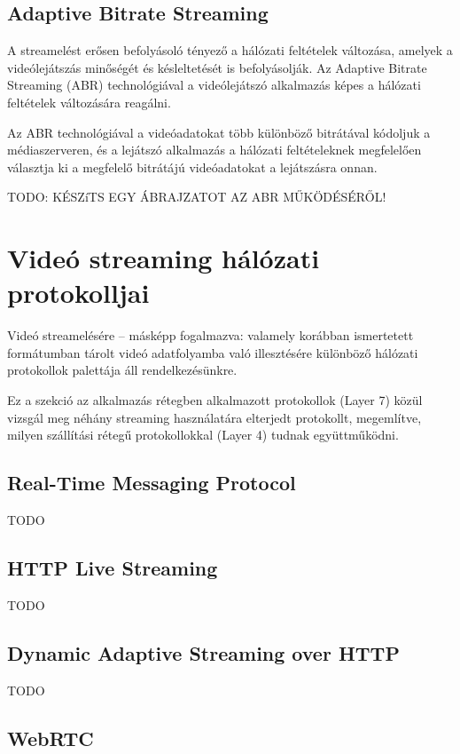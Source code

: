 \subsection{Adaptive Bitrate Streaming}

A streamelést erősen befolyásoló tényező a hálózati feltételek változása, amelyek a videólejátszás minőségét és késleltetését is befolyásolják. Az Adaptive Bitrate Streaming (ABR) technológiával a videólejátszó alkalmazás képes a hálózati feltételek változására reagálni.

Az ABR technológiával a videóadatokat több különböző bitrátával kódoljuk a médiaszerveren, és a lejátszó alkalmazás a hálózati feltételeknek megfelelően választja ki a megfelelő bitrátájú videóadatokat a lejátszásra onnan.

TODO: KÉSZíTS EGY ÁBRAJZATOT AZ ABR MŰKÖDÉSÉRŐL!

\section{Videó streaming hálózati protokolljai}

Videó streamelésére -- másképp fogalmazva: valamely korábban ismertetett formátumban tárolt videó adatfolyamba való illesztésére különböző hálózati protokollok palettája áll rendelkezésünkre.\cite{Wettl04}

Ez a szekció az alkalmazás rétegben alkalmazott protokollok (Layer 7) közül vizsgál meg néhány streaming használatára elterjedt protokollt, megemlítve, milyen szállítási rétegű protokollokkal (Layer 4) tudnak együttműködni.

\subsection{Real-Time Messaging Protocol}

TODO

\subsection{HTTP Live Streaming}

TODO

\subsection{Dynamic Adaptive Streaming over HTTP}

TODO

\subsection{WebRTC}

